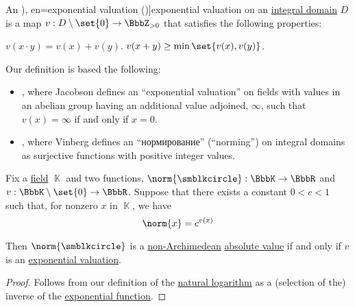 \begin{definition}\label{def:exponential_valuation}
  An \term[ru=нормирование (\cite[437]{Винберг2014КурсАлгебры}), en=exponential valuation (\cite[def. 9.4']{Jacobson1989BasicAlgebraII})]{exponential valuation} on an \hyperref[def:integral_domain]{integral domain} \( D \) is a map \( v: D \setminus \set{ 0 } \to \BbbZ_{>0} \) that satisfies the following properties:
  \begin{thmenum}
     \( v(x \cdot y) = v(x) + v(y) \).
     \( v(x + y) \geq \min\set{ v(x), v(y) } \).
  \end{thmenum}
\end{definition}
\begin{comments}
  \item Our definition is based the following:
  \begin{itemize}
    \item {}, where Jacobson defines an \enquote{exponential valuation} on fields with values in an abelian group having an additional value adjoined, \( \infty \), such that \( v(x) = \infty \) if and only if \( x = 0 \).

    \item {}, where Vinberg defines an \enquote{нормирование} (\enquote{norming}) on integral domains as surjective functions with positive integer values.
  \end{itemize}
\end{comments}

\begin{proposition}\label{thm:exponential_and_additive_valuations}
  Fix a \hyperref[def:field]{field} \( \BbbK \) and two functions, \( \norm{\anon}: \BbbK \to \BbbR \) and \( v: \BbbK \setminus \set{ 0 } \to \BbbR \). Suppose that there exists a constant \( 0 < c < 1 \) such that, for nonzero \( x \) in \( \BbbK \), we have
  \begin{equation}\label{eq:thm:exponential_and_additive_valuations}
    \norm{x} = c^{v(x)}
  \end{equation}

  Then \( \norm{\anon} \) is a \hyperref[def:non_archimedean_absolute_value]{non-Archimedean} \hyperref[def:absolute_value]{absolute value} if and only if \( v \) is an \hyperref[def:exponential_valuation]{exponential valuation}.
\end{proposition}
\begin{proof}
  Follows from our definition of the \hyperref[def:logarithm]{natural logarithm} as a (selection of the) inverse of the \hyperref[def:exponential_function]{exponential function}.
\end{proof}

